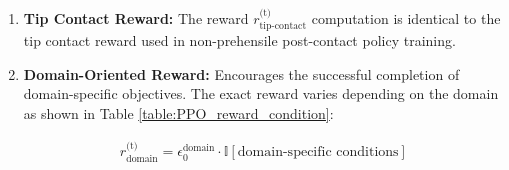 \begin{itemize}
\begin{enumerate}
        \item \textbf{Tip Contact Reward:} The reward $r^\text{(t)}_\text{tip-contact}$ computation is identical to the tip contact reward used in non-prehensile post-contact policy training. %

        \item \textbf{Domain-Oriented Reward:} Encourages the successful completion of domain-specific objectives. The exact reward varies depending on the domain as shown in Table \ref{table:PPO_reward_condition}:

        \[
        \begin{aligned}
        r^\text{(t)}_{\text{domain}} = {\epsilon_0^{\text{domain}}} \cdot \mathbb{I}[\text{domain-specific conditions}]
        \end{aligned}
        \]

        




\end{enumerate}
\end{itemize}
